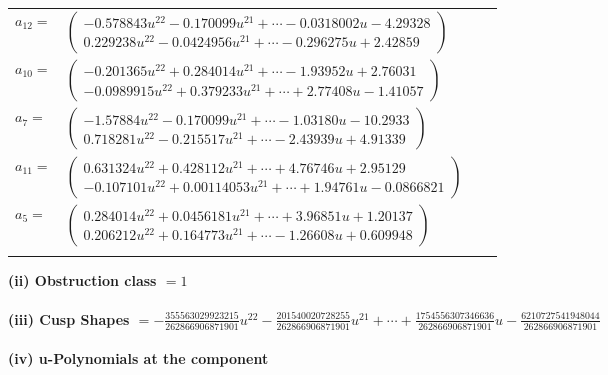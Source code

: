 \documentclass[1p]{elsarticle_modified}
\theoremstyle{definition}
\begin{document}
\begin{tabular}{m{7pt} m{180pt} m{7pt} m{180pt} }
\flushright $a_{12}=$&$\begin{pmatrix}-0.578843 u^{22}-0.170099 u^{21}+\cdots-0.0318002 u-4.29328\\0.229238 u^{22}-0.0424956 u^{21}+\cdots-0.296275 u+2.42859\end{pmatrix}$ \\
\flushright $a_{10}=$&$\begin{pmatrix}-0.201365 u^{22}+0.284014 u^{21}+\cdots-1.93952 u+2.76031\\-0.0989915 u^{22}+0.379233 u^{21}+\cdots+2.77408 u-1.41057\end{pmatrix}$ \\
\flushright $a_{7}=$&$\begin{pmatrix}-1.57884 u^{22}-0.170099 u^{21}+\cdots-1.03180 u-10.2933\\0.718281 u^{22}-0.215517 u^{21}+\cdots-2.43939 u+4.91339\end{pmatrix}$ \\
\flushright $a_{11}=$&$\begin{pmatrix}0.631324 u^{22}+0.428112 u^{21}+\cdots+4.76746 u+2.95129\\-0.107101 u^{22}+0.00114053 u^{21}+\cdots+1.94761 u-0.0866821\end{pmatrix}$ \\
\flushright $a_{5}=$&$\begin{pmatrix}0.284014 u^{22}+0.0456181 u^{21}+\cdots+3.96851 u+1.20137\\0.206212 u^{22}+0.164773 u^{21}+\cdots-1.26608 u+0.609948\end{pmatrix}$\\&\end{tabular}
\flushleft \textbf{(ii) Obstruction class $= 1$}\\~\\
\flushleft \textbf{(iii) Cusp Shapes $= -\frac{355563029923215}{262866906871901} u^{22}-\frac{201540020728255}{262866906871901} u^{21}+\cdots+\frac{1754556307346636}{262866906871901} u-\frac{6210727541948044}{262866906871901}$}\\~\\
\newpage\renewcommand{\arraystretch}{1}
\flushleft \textbf{(iv) u-Polynomials at the component}\newline \\
\end{document}
